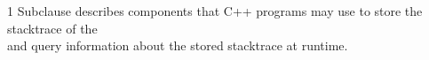 
\cbend


1 Subclause  describes components that C++ programs may use to
store the stacktrace of the \\
and query information about the stored stacktrace at runtime.

